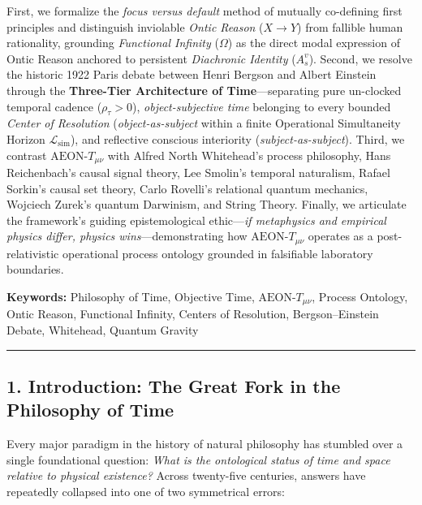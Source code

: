 \documentclass[
]{article}
\begin{document}
First, we formalize the \emph{focus versus default} method of mutually
co-defining first principles and distinguish inviolable \emph{Ontic
Reason} (\(X \to Y\)) from fallible human rationality, grounding
\emph{Functional Infinity} (\(\Omega\)) as the direct modal expression
of Ontic Reason anchored to persistent \emph{Diachronic Identity}
(\(A_s^v\)). Second, we resolve the historic 1922 Paris debate between
Henri Bergson and Albert Einstein through the \textbf{Three-Tier
Architecture of Time}---separating pure un-clocked temporal cadence
(\(\rho_\tau > 0\)), \emph{object-subjective time} belonging to every
bounded \emph{Center of Resolution} (\emph{object-as-subject} within a
finite Operational Simultaneity Horizon \(\mathcal{L}_{\mathrm{sim}}\)),
and reflective conscious interiority (\emph{subject-as-subject}). Third,
we contrast \(\text{AEON-}T_{\mu\nu}\) with Alfred North Whitehead's
process philosophy, Hans Reichenbach's causal signal theory, Lee
Smolin's temporal naturalism, Rafael Sorkin's causal set theory, Carlo
Rovelli's relational quantum mechanics, Wojciech Zurek's quantum
Darwinism, and String Theory. Finally, we articulate the framework's
guiding epistemological ethic---\emph{if metaphysics and empirical
physics differ, physics wins}---demonstrating how
\(\text{AEON-}T_{\mu\nu}\) operates as a post-relativistic operational
process ontology grounded in falsifiable laboratory boundaries.

\textbf{Keywords:} Philosophy of Time, Objective Time,
\(\text{AEON-}T_{\mu\nu}\), Process Ontology, Ontic Reason, Functional
Infinity, Centers of Resolution, Bergson--Einstein Debate, Whitehead,
Quantum Gravity

\begin{center}\rule{0.5\linewidth}{0.5pt}\end{center}

\subsection{1. Introduction: The Great Fork in the Philosophy of
Time}\label{introduction-the-great-fork-in-the-philosophy-of-time}

Every major paradigm in the history of natural philosophy has stumbled
over a single foundational question: \emph{What is the ontological
status of time and space relative to physical existence?} Across
twenty-five centuries, answers have repeatedly collapsed into one of two
symmetrical errors:
\end{document}
